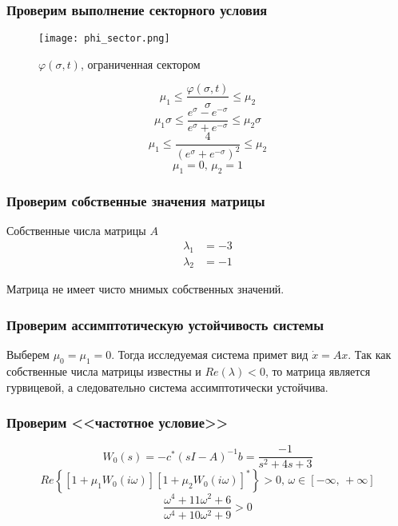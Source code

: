     \subsubsection*{Проверим выполнение секторного условия}
    \begin{figure}[H]
        \centering
        \texttt{[image: phi\_sector.png]}
        \caption{$\varphi(\sigma, t)$, ограниченная сектором}
    \end{figure}

    \[\mu_1 \leq \dfrac{\varphi(\sigma, t)}{\sigma} \leq \mu_2 \]
    \[\mu_1\sigma \leq \dfrac{e^{\sigma} - e^{-\sigma}}{e^{\sigma} + e^{-\sigma}} \leq \mu_2\sigma \]
    \[\mu_1 \leq \dfrac{4}{(e^{\sigma} + e^{-\sigma})^2} \leq \mu_2 \]
    \[\mu_1 = 0,\,\mu_2 = 1\]

    \subsubsection*{Проверим собственные значения матрицы}
    Собственные числа матрицы $A$
    \begin{equation*}
        \begin{aligned}
            \lambda_1 &= -3 \\
            \lambda_2 &= -1
        \end{aligned}
    \end{equation*}

    Матрица не имеет чисто мнимых собственных значений.

    \subsubsection*{Проверим ассимптотическую устойчивость системы}
    Выберем $\mu_0 = \mu_1 = 0$. Тогда исследуемая система примет вид $\dot{x}=Ax$. Так как собственные числа матрицы
    известны и $Re(\lambda) < 0$, то матрица является гурвицевой, а следовательно система ассимптотически устойчива.

    \subsubsection*{Проверим <<частотное условие>>}
    \[W_0(s) = -c^*(sI - A)^{-1}b = \dfrac{-1}{s^2 + 4s + 3}\]
    \[Re\left\{ \left[ 1 + \mu_1 W_0(i\omega) \right] \left[ 1 + \mu_2 W_0(i\omega) \right]^* \right\} > 0, \,
    \omega \in \left[ -\infty,\, +\infty \right]\]
    \[\dfrac{\omega^4 + 11\omega^2 + 6}{\omega^4 + 10\omega^2 +9} > 0\]

